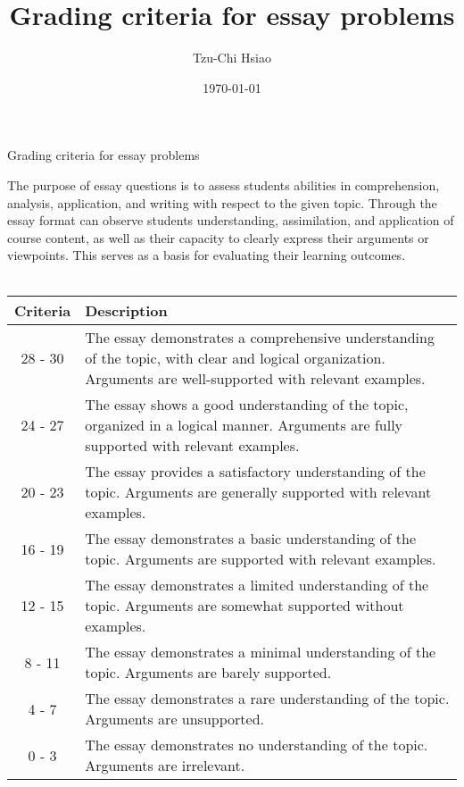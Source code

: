 \documentclass[12pt]{article}
\title{Grading criteria for essay problems}
\author{Tzu-Chi Hsiao}
\date{\today}
\begin{document}
\thispagestyle{fancy}
\begin{center}
\fontsize{16pt}{16pt}\selectfont Grading criteria for essay problems
\end{center}
\fontsize{14pt}{14pt}\selectfont
The purpose of essay questions is to assess students abilities in comprehension, analysis, application, and writing with respect to the given topic. Through the essay format can observe students understanding, assimilation, and application of course content, as well as their capacity to clearly express their arguments or viewpoints. This serves as a basis for evaluating their learning outcomes. \\
\\ \vspace{0.5em}
\begin{tabular}{|c|p{12cm}|}
\hline
Criteria & Description \\
\hline
28 - 30 & The essay demonstrates a comprehensive understanding of the topic, with clear and logical organization. Arguments are well-supported with relevant examples. \\
\hline
24 - 27 & The essay shows a good understanding of the topic, organized in a logical manner. Arguments are fully supported with relevant examples. \\
\hline
20 - 23 & The essay provides a satisfactory understanding of the topic. Arguments are generally supported with relevant examples. \\
\hline
16 - 19 & The essay demonstrates a basic understanding of the topic. Arguments are supported with relevant examples. \\
\hline
12 - 15 & The essay demonstrates a limited understanding of the topic. Arguments are somewhat supported without examples. \\
\hline
8 - 11 & The essay demonstrates a minimal understanding of the topic. Arguments are barely supported. \\
\hline
4 - 7 & The essay demonstrates a rare understanding of the topic. Arguments are unsupported. \\
\hline
0 - 3 & The essay demonstrates no understanding of the topic. Arguments are irrelevant. \\
\hline
\end{tabular}
\end{document}

